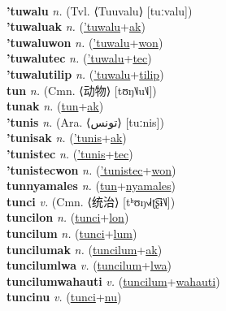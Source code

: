  \label{tulsepic} \\
\textbf{'tuwalu} \textit{n.} (Tvl. ⟨Tuuvalu⟩ [tuːvalu])
 \label{'tuwalu} \\
\textbf{'tuwaluak} \textit{n.} (\hyperref['tuwalu]{'tuwalu}+\hyperref[ak]{ak})
 \label{'tuwaluak} \\
\textbf{'tuwaluwon} \textit{n.} (\hyperref['tuwalu]{'tuwalu}+\hyperref[won]{won})
 \label{'tuwaluwon} \\
\textbf{'tuwalutec} \textit{n.} (\hyperref['tuwalu]{'tuwalu}+\hyperref[tec]{tec})
 \label{'tuwalutec} \\
\textbf{'tuwalutilip} \textit{n.} (\hyperref['tuwalu]{'tuwalu}+\hyperref[tilip]{tilip})
 \label{'tuwalutilip} \\
\textbf{tun} \textit{n.} (Cmn. ⟨动物⟩ [tʊŋ˥˩u˥˩])
 \label{tun} \\
\textbf{tunak} \textit{n.} (\hyperref[tun]{tun}+\hyperref[ak]{ak})
 \label{tunak} \\
\textbf{'tunis} \textit{n.} (Ara. ⟨تونس⟩ [tuːnis])
 \label{'tunis} \\
\textbf{'tunisak} \textit{n.} (\hyperref['tunis]{'tunis}+\hyperref[ak]{ak})
 \label{'tunisak} \\
\textbf{'tunistec} \textit{n.} (\hyperref['tunis]{'tunis}+\hyperref[tec]{tec})
 \label{'tunistec} \\
\textbf{'tunistecwon} \textit{n.} (\hyperref['tunistec]{'tunistec}+\hyperref[won]{won})
 \label{'tunistecwon} \\
\textbf{tunnyamales} \textit{n.} (\hyperref[tun]{tun}+\hyperref[nyamales]{nyamales})
 \label{tunnyamales} \\
\textbf{tunci} \textit{v.} (Cmn. ⟨统治⟩ [tʰʊŋ˧˩˧ʈ͡ʂɨ˥˩])
 \label{tunci} \\
\textbf{tuncilon} \textit{n.} (\hyperref[tunci]{tunci}+\hyperref[lon]{lon})
 \label{tuncilon} \\
\textbf{tuncilum} \textit{n.} (\hyperref[tunci]{tunci}+\hyperref[lum]{lum})
 \label{tuncilum} \\
\textbf{tuncilumak} \textit{n.} (\hyperref[tuncilum]{tuncilum}+\hyperref[ak]{ak})
 \label{tuncilumak} \\
\textbf{tuncilumlwa} \textit{v.} (\hyperref[tuncilum]{tuncilum}+\hyperref[lwa]{lwa})
 \label{tuncilumlwa} \\
\textbf{tuncilumwahauti} \textit{v.} (\hyperref[tuncilum]{tuncilum}+\hyperref[wahauti]{wahauti})
 \label{tuncilumwahauti} \\
\textbf{tuncinu} \textit{v.} (\hyperref[tunci]{tunci}+\hyperref[nu]{nu})
